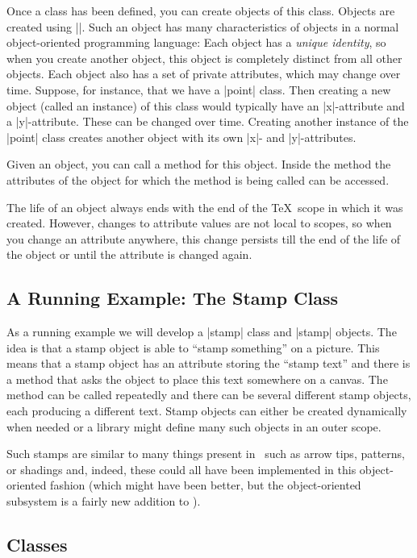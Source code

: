 Once a class has been defined, you can create objects of this
class. Objects are created using |\pgfoonew|. Such an object has many
characteristics of objects in a normal object-oriented programming
language: Each object has a \emph{unique identity}, so when you create
another object, this object is completely distinct from all other
objects. Each object also has a set of private attributes, which may
change over time. Suppose, for instance, that we have a |point|
class. Then creating a new object (called an instance) of this class
would typically have an |x|-attribute and a |y|-attribute. These can
be changed over time. Creating another instance of the
|point| class creates another object with its own |x|- and
|y|-attributes.

Given an object, you can call a method for this object. Inside the
method the attributes of the object for which the method is being
called can be accessed.

The life of an object always ends with the end of the \TeX\ scope in
which it was created. However, changes to attribute values are not
local to scopes, so when you change an attribute anywhere, this change
persists till the end of the life of the object or until the attribute
is changed again.

\subsection{A Running Example: The Stamp Class}

As a running example we will develop a |stamp| class and |stamp|
objects. The idea is that a stamp object is able to ``stamp
something'' on a picture. This means that a stamp object has an
attribute storing the ``stamp text'' and there is a method that asks
the object to place this text somewhere on a
canvas. The method can be called repeatedly and there can be several
different stamp objects, each producing a different text. Stamp
objects can either be created dynamically when needed or a library
might define many such objects in an outer scope.

Such stamps are similar to many things present in \pgfname\ such as
arrow tips, patterns, or shadings and, indeed, these could all have
been implemented in this object-oriented fashion (which might have
been better, but the object-oriented subsystem is a fairly new
addition to \pgfname).


\subsection{Classes}

